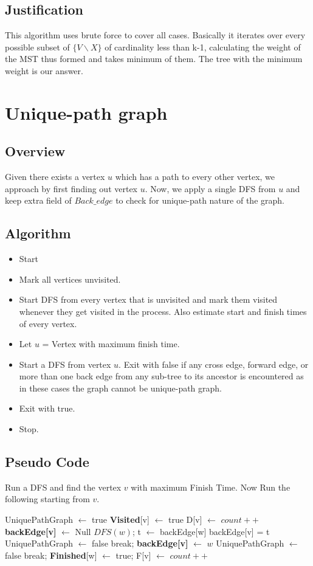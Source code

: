 \documentclass{article}
\begin{document}
\subsection{Justification}
This algorithm uses brute force to cover all cases. Basically it iterates over every possible subset of $\{V\backslash X\}$ of cardinality less than k-1, calculating the weight of the MST thus formed and takes minimum of them. The tree with the minimum weight is our answer.\\  

\newpage
\section{Unique-path graph}
\subsection{Overview}
Given there exists a vertex $u$ which has a path to every other vertex, we approach by first finding out vertex $u$. Now, we apply a single DFS from $u$ and keep extra field of $Back\_edge$ to check for unique-path nature of the graph.
\subsection{Algorithm}
\begin{itemize}
\item Start
\item Mark all vertices unvisited. 
\item Start DFS from every vertex that is unvisited and mark them visited whenever they get visited in the process. Also estimate start and finish times of every vertex.
\item Let $u$ = Vertex with maximum finish time.
\item Start a DFS from vertex $u$. Exit with false if any cross edge, forward edge, or more than one back edge from any sub-tree to its ancestor is encountered as in these cases the graph cannot be unique-path graph.
\item Exit with true.
\item Stop.  
\end{itemize}
\subsection{Pseudo Code}
Run a DFS and find the vertex $v$ with maximum Finish Time. Now Run the following starting from $v$. 
\begin{algorithmic}[1]
\State UniquePathGraph $\gets$ true
\State \textbf{Visited}[v] $\gets$ true
\State D[v] $\gets$ $count++$
\State \textbf{backEdge[v]} $\gets$ Null
\State $DFS(w)$;
\State t $\gets$ backEdge[w]
\State backEdge[v] = t
\EndIf
{}
\State UniquePathGraph $\gets$ false
\State break;
\State \textbf{backEdge[v]} $\gets$ $w$
\Else
\State UniquePathGraph $\gets$ false
\State break;
\EndIf
\EndFor
\State \textbf{Finished}[w] $\gets$ true;
\State F[v] $\gets$ $count++$
\EndProcedure
\end{algorithmic}
\end{document}
